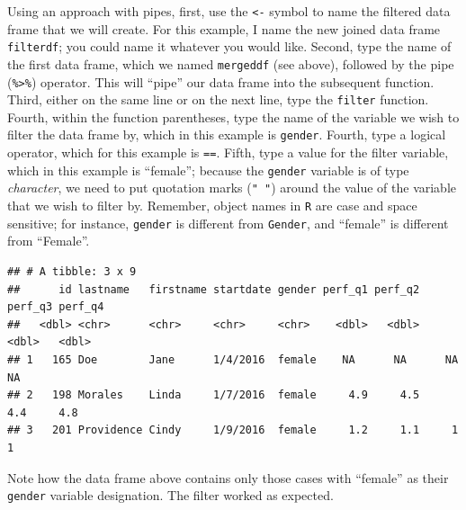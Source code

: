 \documentclass[]{book}
\newenvironment{Shaded}{\begin{snugshade}}{\end{snugshade}}
\newcommand{\KeywordTok}[1]{\textcolor[rgb]{0.13,0.29,0.53}{\textbf{#1}}}
\newcommand{\StringTok}[1]{\textcolor[rgb]{0.31,0.60,0.02}{#1}}
\newcommand{\CommentTok}[1]{\textcolor[rgb]{0.56,0.35,0.01}{\textit{#1}}}
\newcommand{\OperatorTok}[1]{\textcolor[rgb]{0.81,0.36,0.00}{\textbf{#1}}}
\newcommand{\NormalTok}[1]{#1}
\begin{document}
Using an approach with pipes, first, use the \texttt{\textless{}-}
symbol to name the filtered data frame that we will create. For this
example, I name the new joined data frame \texttt{filterdf}; you could
name it whatever you would like. Second, type the name of the first data
frame, which we named \texttt{mergeddf} (see above), followed by the
pipe (\texttt{\%\textgreater{}\%}) operator. This will ``pipe'' our data
frame into the subsequent function. Third, either on the same line or on
the next line, type the \texttt{filter} function. Fourth, within the
function parentheses, type the name of the variable we wish to filter
the data frame by, which in this example is \texttt{gender}. Fourth,
type a logical operator, which for this example is \texttt{==}. Fifth,
type a value for the filter variable, which in this example is
``female''; because the \texttt{gender} variable is of type
\emph{character}, we need to put quotation marks (\texttt{"\ "}) around
the value of the variable that we wish to filter by. Remember, object
names in \texttt{R} are case and space sensitive; for instance,
\texttt{gender} is different from \texttt{Gender}, and ``female'' is
different from ``Female''.

\begin{Shaded}
\end{Shaded}

\begin{verbatim}
## # A tibble: 3 x 9
##      id lastname   firstname startdate gender perf_q1 perf_q2 perf_q3 perf_q4
##   <dbl> <chr>      <chr>     <chr>     <chr>    <dbl>   <dbl>   <dbl>   <dbl>
## 1   165 Doe        Jane      1/4/2016  female    NA      NA      NA      NA  
## 2   198 Morales    Linda     1/7/2016  female     4.9     4.5     4.4     4.8
## 3   201 Providence Cindy     1/9/2016  female     1.2     1.1     1       1
\end{verbatim}

Note how the data frame above contains only those cases with ``female''
as their \texttt{gender} variable designation. The filter worked as
expected.
\end{document}
